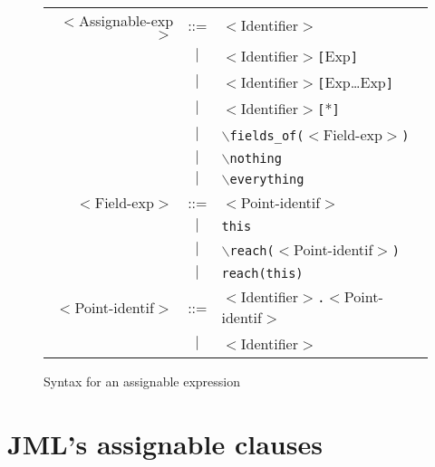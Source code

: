 \documentclass[a4paper]{llncs}
\begin{document}
\begin{figure}[tb]
\begin{tabular}{rcl}

$<$\textsf{Assignable-exp}$>$  
  & ::=  & $<$\textsf{Identifier}$>$ \\
  &$\mid$& $<$\textsf{Identifier}$>$\texttt{[}\textsf{Exp}\texttt{]} \\
  &$\mid$& $<$\textsf{Identifier}$>$\texttt{[}\textsf{Exp}\ldots \textsf{Exp}\texttt{]}  \\
  &$\mid$& $<$\textsf{Identifier}$>$\texttt{[}*\texttt{]} \\
  &$\mid$& $\backslash$\texttt{fields\_of(}$<$\textsf{Field-exp}$>$\texttt{)}  \\
  &$\mid$& $\backslash$\texttt{nothing} \\
  &$\mid$& $\backslash$\texttt{everything} \\

$<$\textsf{Field-exp}$>$ 
  & ::=  & $<$\textsf{Point-identif}$>$  \\
  &$\mid$& \texttt{this} \\
  &$\mid$& $\backslash$\texttt{reach(}$<$\textsf{Point-identif}$>$\texttt{)}  \\
  &$\mid$& \texttt{reach(}\texttt{this}\texttt{)}  \\

$<$\textsf{Point-identif}$>$   
  & ::=  & $<$\textsf{Identifier}$>$\texttt{.}$<$\textsf{Point-identif}$> $ \\
  &$\mid$ & $<$\textsf{Identifier}$>$ \\
\end{tabular}
\caption{Syntax for an assignable expression}\label{FigAssignableExpr}
\end{figure}


\section{JML's assignable clauses}
\label{sec-ass}
\end{document}
